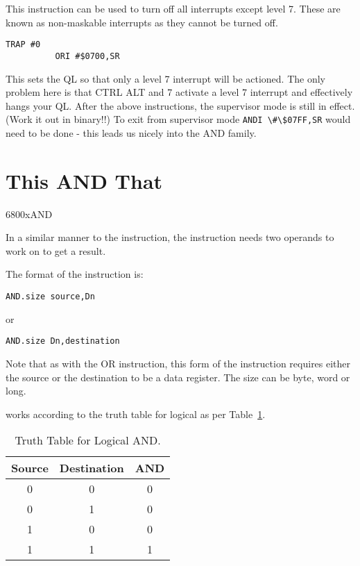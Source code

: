 This instruction can be used to turn off all interrupts except level
    7. These are known as non-{}maskable interrupts as they cannot be turned
    off.

\begin{lstlisting}[firstnumber=1,]
          TRAP #0
          ORI #$0700,SR
\end{lstlisting}

This sets the QL so that only a level 7 interrupt will be actioned.
    The only problem here is that CTRL ALT and 7 activate a level 7 interrupt
    and effectively hangs your QL. After the above instructions, the
    supervisor mode is still in effect. (Work it out in binary!!) To exit
    from supervisor mode \lstinline{ANDI \#\$07FF,SR} would need to be done -{} this leads us
    nicely into the AND family.

\section{This AND That}\mc6800x{AND}
\label{ch4-and}%

In a similar manner to the  instruction, the  instruction needs
    two operands to work on to get a result.

The format of the  instruction is:

\begin{lstlisting}[firstnumber=1,]
          AND.size source,Dn
\end{lstlisting}

or

\begin{lstlisting}[firstnumber=1,]
          AND.size Dn,destination
\end{lstlisting}

Note that as with the OR instruction, this form of the instruction
    requires either the source or the destination to be a data register. The
    size can be byte, word or long.

 works according to the truth table for logical  as per Table~\ref{tab:TruthTableForLogicalAND}.


\begin{table}[h]
\centering
\begin{tabular}{cc|c}

Source & Destination & AND\\ \hline
0 & 0 & 0 \\
0 & 1 & 0 \\
1 & 0 & 0 \\
1 & 1 & 1

\end{tabular}
\caption{Truth Table for Logical AND.}
\label{tab:TruthTableForLogicalAND}
\end{table}


